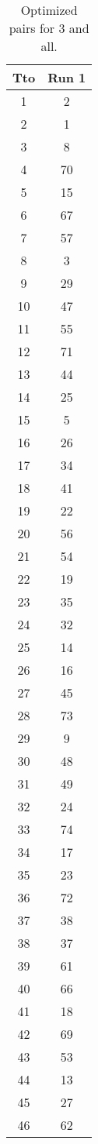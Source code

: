 \begin{table}
  \centering
  \scriptsize
  \caption{Optimized pairs for 3 and all.}
  \label{tab_pairs}
\begin{tabular}{c c }
\hline
Tto & Run 1 \\
\hline
1 & 2 \\
2 & 1 \\
3 & 8 \\
4 & 70 \\
5 & 15 \\
6 & 67 \\
7 & 57 \\
8 & 3 \\
9 & 29 \\
10 & 47 \\
11 & 55 \\
12 & 71 \\
13 & 44 \\
14 & 25 \\
15 & 5 \\
16 & 26 \\
17 & 34 \\
18 & 41 \\
19 & 22 \\
20 & 56 \\
21 & 54 \\
22 & 19 \\
23 & 35 \\
24 & 32 \\
25 & 14 \\
26 & 16 \\
27 & 45 \\
28 & 73 \\
29 & 9 \\
30 & 48 \\
31 & 49 \\
32 & 24 \\
33 & 74 \\
34 & 17 \\
35 & 23 \\
36 & 72 \\
37 & 38 \\
38 & 37 \\
39 & 61 \\
40 & 66 \\
41 & 18 \\
42 & 69 \\
43 & 53 \\
44 & 13 \\
45 & 27 \\
46 & 62 \\

\end{tabular}
\end{table}
